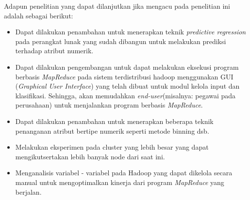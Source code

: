 Adapun penelitian yang dapat dilanjutkan jika mengacu pada penelitian ini adalah sebagai berikut:
\begin{itemize}
	\item Dapat dilakukan penambahan untuk menerapkan teknik \textit{predictive regression} pada perangkat lunak yang sudah dibangun untuk melakukan prediksi terhadap atribut numerik.
	\item Dapat dilakukan pengembangan untuk dapat melakukan eksekusi program berbasis \textit{MapReduce} pada sistem terdistribusi hadoop menggunakan GUI (\textit{Graphical User Interface}) yang telah dibuat untuk modul kelola input dan klasifikasi. Sehingga, akan memudahkan \textit{end-user}(misalnya: pegawai pada perusahaan) untuk menjalankan program berbasis \textit{MapReduce}.
	\item Dapat dilakukan penambahan untuk menerapkan beberapa teknik penanganan atribut bertipe numerik seperti metode binning dsb.
	\item Melakukan eksperimen pada cluster yang lebih besar yang dapat mengikutsertakan lebih banyak node dari saat ini.
	\item Menganalisis variabel - variabel pada Hadoop yang dapat dikelola secara manual untuk mengoptimalkan kinerja dari program \textit{MapReduce} yang berjalan.
\end{itemize}

